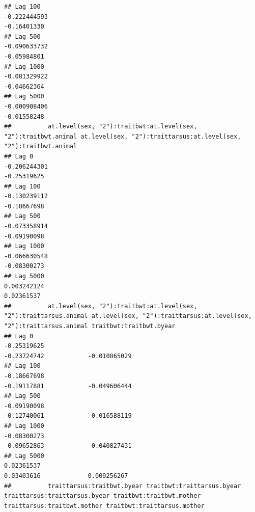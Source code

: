\documentclass[
  12pt,
]{book}
\begin{document}
\begin{verbatim}
## Lag 100                                                       -0.222444593                                                          -0.16401330
## Lag 500                                                       -0.090633732                                                          -0.05984801
## Lag 1000                                                      -0.081329922                                                          -0.04662364
## Lag 5000                                                      -0.000908406                                                          -0.01558248
##          at.level(sex, "2"):traitbwt:at.level(sex, "2"):traitbwt.animal at.level(sex, "2"):traittarsus:at.level(sex, "2"):traitbwt.animal
## Lag 0                                                      -0.206244301                                                       -0.25319625
## Lag 100                                                    -0.130239112                                                       -0.18667698
## Lag 500                                                    -0.073358914                                                       -0.09190098
## Lag 1000                                                   -0.066630548                                                       -0.08300273
## Lag 5000                                                    0.003242124                                                        0.02361537
##          at.level(sex, "2"):traitbwt:at.level(sex, "2"):traittarsus.animal at.level(sex, "2"):traittarsus:at.level(sex, "2"):traittarsus.animal traitbwt:traitbwt.byear
## Lag 0                                                          -0.25319625                                                          -0.23724742            -0.010865029
## Lag 100                                                        -0.18667698                                                          -0.19117881            -0.049606444
## Lag 500                                                        -0.09190098                                                          -0.12740061            -0.016588119
## Lag 1000                                                       -0.08300273                                                          -0.09652863             0.040827431
## Lag 5000                                                        0.02361537                                                           0.03403616             0.009256267
##          traittarsus:traitbwt.byear traitbwt:traittarsus.byear traittarsus:traittarsus.byear traitbwt:traitbwt.mother traittarsus:traitbwt.mother traitbwt:traittarsus.mother

\end{verbatim}
\end{document}

